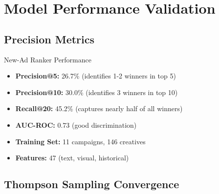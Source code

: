 \documentclass[11pt,a4paper]{report}
\begin{document}
\section{Model Performance Validation}

\subsection{Precision Metrics}

\begin{metricbox}{New-Ad Ranker Performance}
\begin{itemize}
    \item \textbf{Precision@5:} 26.7\% (identifies 1-2 winners in top 5)
    \item \textbf{Precision@10:} 30.0\% (identifies 3 winners in top 10)
    \item \textbf{Recall@20:} 45.2\% (captures nearly half of all winners)
    \item \textbf{AUC-ROC:} 0.73 (good discrimination)
    \item \textbf{Training Set:} 11 campaigns, 146 creatives
    \item \textbf{Features:} 47 (text, visual, historical)
\end{itemize}
\end{metricbox}

\subsection{Thompson Sampling Convergence}
\end{document}
